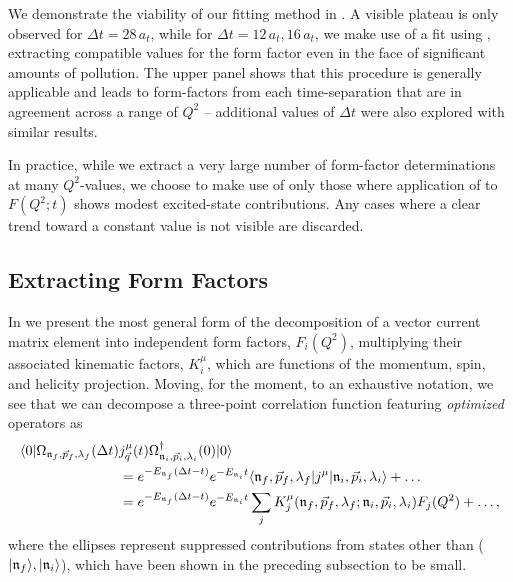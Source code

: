 We demonstrate the viability of our fitting method in . A visible plateau is only observed for $\Delta t = 28\, a_t$, while for $\Delta t = 12\, a_t, 16\, a_t$, we make use of a fit using , extracting compatible values for the form factor even in the face of significant amounts of pollution. The upper panel shows that this procedure is generally applicable and leads to form-factors from each time-separation that are in agreement across a range of $Q^2$ -- additional values of $\Delta t$ were also explored with similar results.

In practice, while we extract a very large number of form-factor determinations at many $Q^2$-values, we choose to make use of only those where application of  to $F(Q^2;t)$ shows modest excited-state contributions. Any cases where a clear trend toward a constant value is not visible are discarded.


\subsection{Extracting Form Factors} \label{sec::FFExtract}
In  we present the most general form of the decomposition of a vector current matrix element into independent form factors, $F_i(Q^2)$, multiplying their associated kinematic factors, $K_i^\mu$, which are functions of the momentum, spin, and helicity projection. Moving, for the moment, to an exhaustive notation, we see that we can decompose a three-point correlation function featuring \emph{optimized} operators as 
\begin{align}
\langle 0 | \Omega_{\mathfrak{n}_f,\vec{p}_f, \lambda_f}(\Delta t) &j^\mu_{\vec{q}}(t) \Omega^\dagger_{\mathfrak{n}_i,\vec{p}_i, \lambda_i}(0) | 0 \rangle \notag \\ &= e^{-E_{\mathfrak{n}_f}(\Delta t - t)} e^{-E_{\mathfrak{n}_i}t} \langle \mathfrak{n}_f ,\vec{p}_f, \lambda_f | j^\mu | \mathfrak{n}_i,\vec{p}_i, \lambda_i \rangle + \ldots \label{eqn::llsq_p}\\ 
&=  e^{-E_{\mathfrak{n}_f}(\Delta t - t)} e^{-E_{\mathfrak{n}_i}t} \sum_j K^\mu_j(\mathfrak{n}_f ,\vec{p}_f, \lambda_f;\mathfrak{n}_i,\vec{p}_i, \lambda_i ) F_j(Q^2) + \ldots \notag,
\end{align}
where the ellipses represent suppressed contributions from states other than ($|\mathfrak{n}_f\rangle , |\mathfrak{n}_i\rangle $), which have been shown in the preceding subsection to be small. 

